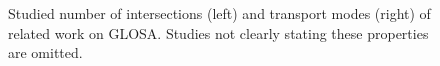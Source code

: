 \begin{figure}[t]
\centering
{}
\caption{Studied number of intersections (left) and transport modes (right) of related work on GLOSA. Studies not clearly stating these properties are omitted.}
\label{fig:related-work-additional-piecharts}
\end{figure}

